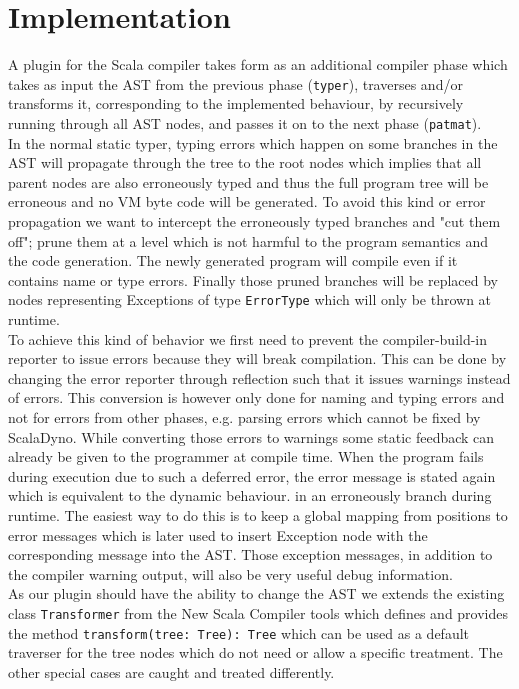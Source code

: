 \section{Implementation}

A plugin for the Scala compiler takes form as an additional compiler phase which takes as input the AST from the previous phase (\texttt{typer}), traverses and/or transforms it, corresponding to the implemented behaviour, by recursively running through all AST nodes, and passes it on to the next phase (\texttt{patmat}).
\\
In the normal static typer, typing errors which happen on some branches in the AST will propagate through the tree to the root nodes which implies that all parent nodes are also erroneously typed and thus the full program tree will be erroneous and no VM byte code will be generated. To avoid this kind or error propagation we want to intercept the erroneously typed branches and "cut them off"; prune them at a level which is not harmful to the program semantics and the code generation. The newly generated program will compile even if it contains name or type errors. Finally those pruned branches will be replaced by nodes representing Exceptions of type \texttt{ErrorType} which will only be thrown at runtime.
\\
To achieve  this kind of behavior we first need to prevent the compiler-build-in reporter to issue errors because they will break compilation. This can be done by changing the error reporter through reflection such that it issues warnings instead of errors. This conversion is however only done for naming and typing errors and not for errors from other phases, e.g. parsing errors which cannot be fixed by ScalaDyno. While converting those errors to warnings some static feedback can already be given to the programmer at compile time. When the program fails during execution due to such a deferred error, the error message is stated again which is equivalent to the dynamic behaviour.
in an erroneously branch during runtime. The easiest way to do this is to keep a global mapping from positions to error messages which is later used to insert Exception node with the corresponding message into the AST. Those exception messages, in addition to the compiler warning output, will also be very useful debug information.
\\
As our plugin should have the ability to change the AST we extends the existing class \texttt{Transformer} from the New Scala Compiler tools which defines and provides the method \texttt{transform(tree: Tree): Tree} which can be used as a default traverser for the tree nodes which do not need or allow a specific treatment. The other special cases are caught and treated differently.
